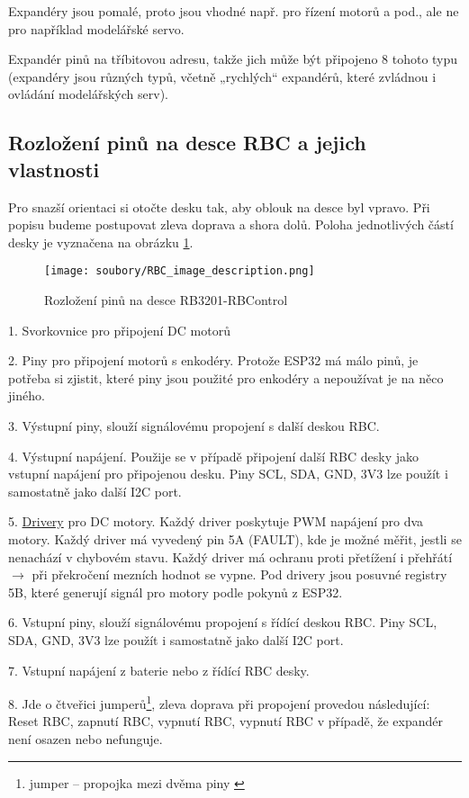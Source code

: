 Expandéry jsou pomalé, proto jsou vhodné např. pro řízení motorů a pod.,
ale ne pro například modelářské servo.

Expandér pinů na tříbitovou adresu, takže jich může být připojeno 8 tohoto typu (expandéry jsou různých typů, včetně „rychlých“ expandérů, které
zvládnou i ovládání modelářských serv).


\subsection{Rozložení pinů na desce RBC a jejich vlastnosti}

Pro snazší orientaci si otočte desku tak, aby oblouk na desce byl vpravo. 
Při popisu budeme postupovat zleva doprava a shora dolů. 
Poloha jednotlivých částí desky je vyznačena na obrázku \ref{fig:rbc}. 

 \begin{figure}[h]
 	\texttt{[image: soubory/RBC\_image\_description.png]}  %
 	\caption{Rozložení pinů na desce RB3201-RBControl} 
 	\label{fig:rbc}
 	\end{figure}	


1. Svorkovnice pro připojení DC motorů 

2.  Piny pro připojení motorů s enkodéry. 
Protože ESP32 má málo pinů, je potřeba si zjistit, které piny jsou použité pro enkodéry a nepoužívat je na něco jiného. 

3. Výstupní piny, slouží signálovému propojení s další deskou RBC. 

4. Výstupní napájení. Použije se v případě připojení další RBC desky jako vstupní napájení pro připojenou desku. 
Piny SCL, SDA, GND, 3V3 lze použít i samostatně jako další I2C port.

5. \hyperref[driver]{Drivery} pro DC motory. Každý driver poskytuje PWM napájení pro dva motory. 
Každý driver má vyvedený pin 5A (FAULT), kde je možné měřit, jestli se nenachází v chybovém stavu. 
Každý driver má ochranu proti přetížení i přehřátí $\rightarrow$ při překročení mezních hodnot se vypne. 
Pod drivery jsou posuvné registry 5B, které generují signál pro motory podle pokynů z ESP32.

6. Vstupní piny, slouží signálovému propojení s řídící deskou RBC. 
Piny SCL, SDA, GND, 3V3 lze použít i samostatně jako další I2C port.

7. Vstupní napájení z baterie nebo z řídící RBC desky. 

8. Jde o čtveřici jumperů\footnote{jumper -- propojka mezi dvěma piny  \label{jumper} }, zleva doprava při propojení provedou následující: Reset RBC, zapnutí RBC, vypnutí RBC, vypnutí RBC v případě, že expandér není osazen nebo nefunguje.  

